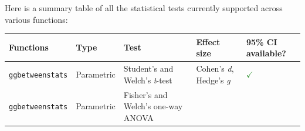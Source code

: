 \documentclass[]{article}
\begin{document}
Here is a summary table of all the statistical tests currently supported
across various functions:

\begin{longtable}[]{@{}lllll@{}}
\toprule
\begin{minipage}[b]{0.20\columnwidth}\raggedright
Functions\strut
\end{minipage} & \begin{minipage}[b]{0.16\columnwidth}\raggedright
Type\strut
\end{minipage} & \begin{minipage}[b]{0.31\columnwidth}\raggedright
Test\strut
\end{minipage} & \begin{minipage}[b]{0.12\columnwidth}\raggedright
Effect size\strut
\end{minipage} & \begin{minipage}[b]{0.07\columnwidth}\raggedright
95\% CI available?\strut
\end{minipage}\tabularnewline
\midrule
\endhead
\begin{minipage}[t]{0.20\columnwidth}\raggedright
\texttt{ggbetweenstats}\strut
\end{minipage} & \begin{minipage}[t]{0.16\columnwidth}\raggedright
Parametric\strut
\end{minipage} & \begin{minipage}[t]{0.31\columnwidth}\raggedright
Student's and Welch's \emph{t}-test\strut
\end{minipage} & \begin{minipage}[t]{0.12\columnwidth}\raggedright
Cohen's \emph{d}, Hedge's \emph{g}\strut
\end{minipage} & \begin{minipage}[t]{0.07\columnwidth}\raggedright
\textcolor{ForestGreen}{$\checkmark$}\strut
\end{minipage}\tabularnewline
\begin{minipage}[t]{0.20\columnwidth}\raggedright
\texttt{ggbetweenstats}\strut
\end{minipage} & \begin{minipage}[t]{0.16\columnwidth}\raggedright
Parametric\strut
\end{minipage} & \begin{minipage}[t]{0.31\columnwidth}\raggedright
Fisher's and Welch's one-way ANOVA\strut
\end{minipage} & \begin{minipage}[t]{0.12\columnwidth}\raggedright

\end{minipage}
\end{longtable}
\end{document}
